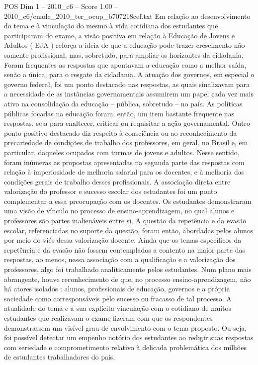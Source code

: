 \begin{textsample}{POS Dim 1 – 2010\_c6 – Score 1.00 – 2010\_c6/enade\_2010\_ter\_ocup\_b707218cef.txt}
Em relação ao desenvolvimento do tema e à vinculação do mesmo à vida cotidiana dos estudantes que participaram do exame, a visão positiva em relação à Educação de Jovens e Adultos ( EJA ) reforça a ideia de que a educação pode trazer crescimento não somente profissional, mas, sobretudo, para ampliar os horizontes da cidadania.
Foram frequentes as respostas que apontavam a educação como a melhor saída, senão a única, para o resgate da cidadania.
A atuação dos governos, em especial o governo federal, foi um ponto destacado nas respostas, as quais sinalizavam para a necessidade de as instâncias governamentais assumirem um papel cada vez mais ativo na consolidação da educação – pública, sobretudo – no país.
As políticas públicas focadas na educação foram, então, um item bastante frequente nas respostas, seja para enaltecer, criticar ou requisitar a ação governamental.
Outro ponto positivo destacado diz respeito à consciência ou ao reconhecimento da precariedade de condições de trabalho dos professores, em geral, no Brasil e, em particular, daqueles ocupados com turmas de jovens e adultos.
Nesse sentido, foram inúmeras as propostas apresentadas na segunda parte das respostas com relação à imperiosidade de melhoria salarial para os docentes, e à melhoria das condições gerais de trabalho desses profissionais.
A associação direta entre valorização do professor e sucesso escolar dos estudantes foi um ponto complementar a essa preocupação com os docentes.
Os estudantes demonstraram uma visão de vínculo no processo de ensino-aprendizagem, no qual alunos e professores são partes inalienáveis entre si.
A questão da repetência e da evasão escolar, referenciadas no suporte da questão, foram então, abordadas pelos alunos por meio do viés dessa valorização docente.
Ainda que os temas específicos da repetência e da evasão não fossem contemplados a contento na maior parte das respostas, ao menos, nessa associação com a qualificação e a valorização dos professores, algo foi trabalhado analiticamente pelos estudantes.
Num plano mais abrangente, houve reconhecimento de que, no processo ensino-aprendizagem, não há atores isolados : alunos, profissionais de educação, governos e a própria sociedade como corresponsáveis pelo sucesso ou fracasso de tal processo.
A atualidade do tema e a sua explícita vinculação com o cotidiano de muitos estudantes que realizavam o exame fizeram com que os respondentes demonstrassem um visível grau de envolvimento com o tema proposto.
Ou seja, foi possível detectar um empenho notório dos estudantes ao redigir suas respostas com seriedade e comprometimento relativo à delicada problemática dos milhões de estudantes trabalhadores do país.

\end{textsample}
